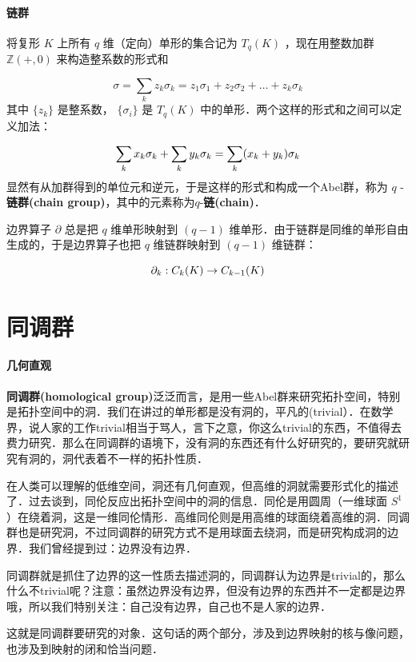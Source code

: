         \paragraph{链群}
            将复形 $K$ 上所有 $q$ 维（定向）单形的集合记为 $T_q(K)$ ，现在用整数加群 $\mathbb{Z}(+,0)$ 来构造整系数的形式和\par
            $$
                \sigma = \sum_k z_k\sigma_k = z_1\sigma_1 + z_2\sigma_2 + \dots + z_k\sigma_k \label{eq:homology-chain}
            $$
            其中 $\{z_k\}$ 是整系数， $\{ \sigma_i \}$ 是 $T_q(K)$ 中的单形．两个这样的形式和之间可以定义加法：\par
            $$
                \sum_k x_k\sigma_k + \sum_k y_k\sigma_k = \sum_k (x_k + y_k)\sigma_k \\
            $$
            显然有从加群得到的单位元和逆元，于是这样的形式和构成一个Abel群，称为 $q$ -\textbf{链群(chain group)}，其中的元素称为$q$-\textbf{链(chain)}．\par
            边界算子 $\partial$ 总是把 $q$ 维单形映射到 $(q-1)$ 维单形．由于链群是同维的单形自由生成的，于是边界算子也把 $q$ 维链群映射到 $(q-1)$ 维链群：\par
            $$
                \partial_k: C_k(K) \to C_{k-1}(K) \\
            $$


\section{同调群}

        \paragraph{几何直观}
            \textbf{同调群(homological group)}泛泛而言，是用一些Abel群来研究拓扑空间，特别是拓扑空间中的洞．我们在讲过的单形都是没有洞的，平凡的(trivial）．在数学界，说人家的工作trivial相当于骂人，言下之意，你这么trivial的东西，不值得去费力研究．那么在同调群的语境下，没有洞的东西还有什么好研究的，要研究就研究有洞的，洞代表着不一样的拓扑性质．\par
            在人类可以理解的低维空间，洞还有几何直观，但高维的洞就需要形式化的描述了．过去谈到，同伦反应出拓扑空间中的洞的信息．同伦是用圆周（一维球面 $S^1$ ）在绕着洞，这是一维同伦情形．高维同伦则是用高维的球面绕着高维的洞．同调群也是研究洞，不过同调群的研究方式不是用球面去绕洞，而是研究构成洞的边界．我们曾经提到过：边界没有边界．\par
            同调群就是抓住了边界的这一性质去描述洞的，同调群认为边界是trivial的，那么什么不trivial呢？注意：虽然边界没有边界，但没有边界的东西并不一定都是边界哦，所以我们特别关注：自己没有边界，自己也不是人家的边界．\par
            这就是同调群要研究的对象．这句话的两个部分，涉及到边界映射的核与像问题，也涉及到映射的闭和恰当问题．\par

